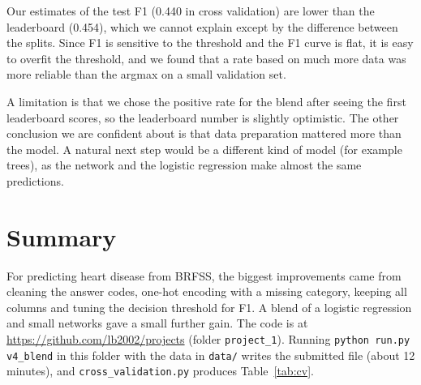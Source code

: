 \documentclass[10pt,conference,compsocconf]{IEEEtran}
\begin{document}
Our estimates of the test F1 (0.440 in cross validation) are lower than the leaderboard (0.454), which we cannot explain except by the difference between the splits. Since F1 is sensitive to the threshold and the F1 curve is flat, it is easy to overfit the threshold, and we found that a rate based on much more data was more reliable than the argmax on a small validation set.

A limitation is that we chose the positive rate for the blend after seeing the first leaderboard scores, so the leaderboard number is slightly optimistic. The other conclusion we are confident about is that data preparation mattered more than the model. A natural next step would be a different kind of model (for example trees), as the network and the logistic regression make almost the same predictions.

\section{Summary}

For predicting heart disease from BRFSS, the biggest improvements came from cleaning the answer codes, one-hot encoding with a missing category, keeping all columns and tuning the decision threshold for F1. A blend of a logistic regression and small networks gave a small further gain. The code is at \url{https://github.com/lb2002/projects} (folder \texttt{project\_1}). Running \texttt{python run.py v4\_blend} in this folder with the data in \texttt{data/} writes the submitted file (about 12 minutes), and \texttt{cross\_validation.py} produces Table~\ref{tab:cv}.



\end{document}
